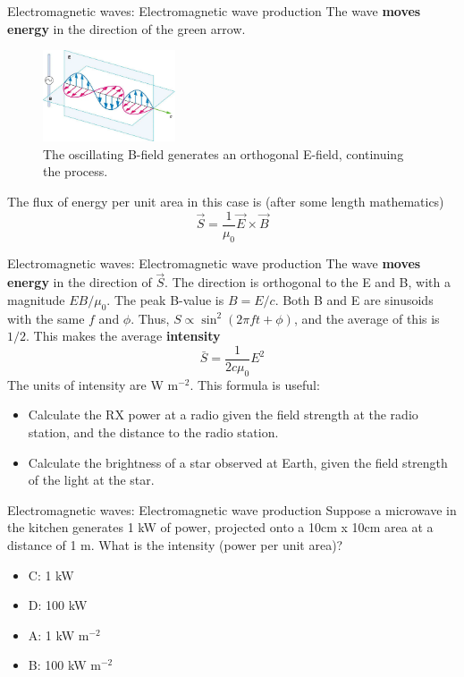 \documentclass{beamer}
\begin{document}
\begin{frame}{Electromagnetic waves: Electromagnetic wave production}
The wave \textbf{\alert{moves energy}} in the direction of the green arrow.
\begin{figure}
\centering
\includegraphics[width=0.35\textwidth]{figures/gen3.png}
\caption{\label{fig:gen4} The oscillating B-field generates an orthogonal E-field, continuing the process.}
\end{figure}
The flux of energy per unit area in this case is (after some length mathematics)
\begin{equation}
\vec{S} = \frac{1}{\mu_0} \vec{E} \times \vec{B}
\end{equation}
\end{frame}

\begin{frame}{Electromagnetic waves: Electromagnetic wave production}
The wave \textbf{\alert{moves energy}} in the direction of $\vec{S}$.  The direction is orthogonal to the E and B, with a magnitude $EB/\mu_0$.  The peak B-value is $B = E/c$.  Both B and E are sinusoids with the same $f$ and $\phi$.  Thus, $S \propto \sin^2(2\pi ft +\phi)$, and the average of this is $1/2$.  This makes the average \textbf{\alert{intensity}}
\begin{equation}
\bar{S} = \frac{1}{2c\mu_0}E^2
\end{equation}
The units of intensity are W m$^{-2}$.  This formula is useful:
\begin{itemize}
\item Calculate the RX power at a radio given the field strength at the radio station, and the distance to the radio station.
\item Calculate the brightness of a star observed at Earth, given the field strength of the light at the star.
\end{itemize}
\end{frame}

\begin{frame}{Electromagnetic waves: Electromagnetic wave production}
Suppose a microwave in the kitchen generates 1 kW of power, projected onto a 10cm x 10cm area at a distance of 1 m.  What is the intensity (power per unit area)?
\begin{itemize}
\item C: 1 kW
\item D: 100 kW
\item A: 1 kW m$^{-2}$
\item B: 100 kW m$^{-2}$
\end{itemize}
\end{frame}
\end{document}
